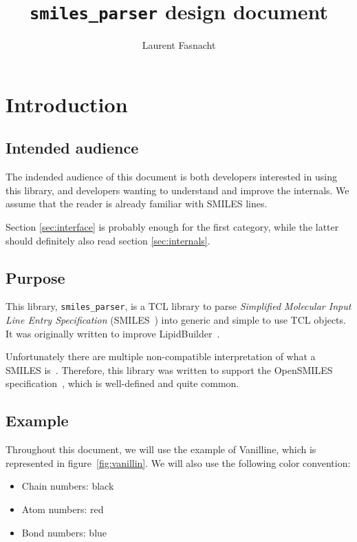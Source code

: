 \documentclass[a4paper, 11pt]{article}
\begin{document}
 
\title{\texttt{smiles\_parser} design document}
\author{Laurent Fasnacht}
 
\maketitle



\newpage
{\parskip 0pt
\tableofcontents

\listoffigures
}
 
\section{Introduction}

\subsection{Intended audience}
The indended audience of this document is both developers interested in using this library, and developers wanting to understand and improve the internals. We assume that the reader is already familiar with SMILES lines.

Section \ref{sec:interface} is probably enough for the first category, while the latter should definitely also read section \ref{sec:internals}.

\subsection{Purpose}

This library, \texttt{smiles\_parser}, is a TCL library to parse \textit{Simplified Molecular Input Line Entry Specification} (SMILES~\cite{SMILES}) into generic and simple to use TCL objects. It was originally written to improve LipidBuilder~\cite{LB}.

Unfortunately there are multiple non-compatible interpretation of what a SMILES is~\cite{OEChem_TK_SMILES_impl}. Therefore, this library was written to support the {OpenSMILES} specification~\cite{OpenSMILES}, which is well-defined and quite common.

\subsection{Example}

Throughout this document, we will use the example of Vanilline, which is represented in figure~\ref{fig:vanillin}. We will also use the following color convention:
\begin{itemize}
    \item Chain numbers: black
    \item Atom numbers: {\color{red}red}
    \item Bond numbers: {\color{blue}blue}
\end{itemize}
\end{document}
